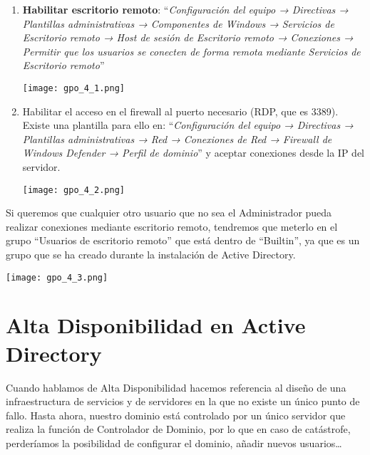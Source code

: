 \begin{enumerate}
    \item \textbf{Habilitar escritorio remoto}: “\textit{Configuración del equipo  →  Directivas  →  Plantillas administrativas \hfill →   Componentes de Windows → Servicios de Escritorio remoto → Host de sesión de Escritorio remoto → Conexiones → Permitir que los usuarios se conecten de forma remota mediante Servicios de Escritorio remoto}”

    \begin{center}
        \texttt{[image: gpo\_4\_1.png]}
    \end{center}

    \item Habilitar el acceso en el firewall al puerto necesario (RDP, que es 3389). Existe una plantilla para ello en: “\textit{Configuración del equipo → Directivas → Plantillas administrativas → Red → Conexiones de Red → Firewall de Windows Defender → Perfil de dominio}” y aceptar conexiones desde la IP del servidor.

    \begin{center}
        \texttt{[image: gpo\_4\_2.png]}
    \end{center}
\end{enumerate}

Si queremos que cualquier otro usuario que no sea el Administrador pueda realizar conexiones mediante escritorio remoto, tendremos que meterlo en el grupo “Usuarios de escritorio remoto” que está dentro de “Builtin”, ya que es un grupo que se ha creado durante la instalación de Active Directory.

\begin{center}
    \texttt{[image: gpo\_4\_3.png]}
\end{center}



\chapter{Alta Disponibilidad en Active Directory}
Cuando hablamos de Alta Disponibilidad hacemos referencia al diseño de una infraestructura de servicios y de servidores en la que no existe un único punto de fallo. Hasta ahora, nuestro dominio está controlado por un único servidor que realiza la función de Controlador de Dominio, por lo que en caso de catástrofe, perderíamos la posibilidad de configurar el dominio, añadir nuevos usuarios…

